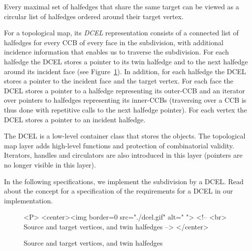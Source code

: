 Every maximal set of halfedges that share the same target can be viewed 
as a circular list of halfedges ordered %
around their target vertex.

For a topological map, its {\em DCEL} representation consists of a
connected list of halfedges for every CCB of every face in the
subdivision, with additional incidence information that enables us to
traverse the subdivision. %
For each halfedge the DCEL
stores a pointer to its twin halfedge and to the next
halfedge around its incident face (see Figure~\ref{fig:DCEL_ref}). In
addition, for each halfedge the DCEL stores a pointer to the incident
face and the target vertex.
For each face the DCEL stores a pointer to a halfedge representing
its outer-CCB and an iterator over pointers to halfedges representing
its inner-CCBs (traversing over a CCB is thus done with repetitive
calls to the next halfedge pointer).
For each vertex the DCEL stores a pointer to an incident halfedge. 

The DCEL is a low-level container class that stores the objects.
The topological map layer adds high-level functions and protection of
combinatorial validity. Iterators, handles and circulators are also
introduced in this layer (pointers are no longer visible in this layer).

In the following
specifications, we implement the subdivision by a DCEL. Read about the concept
for a specification of the requirements for a DCEL in our implementation.

\begin{figure}
\begin{ccTexOnly}
    \centerline{
       }
\end{ccTexOnly}
\caption{Source and target vertices, and twin halfedges \label{fig:DCEL_ref}}

\begin{ccHtmlOnly}
<P>
<center><img border=0 src="./dcel.gif" alt=" ">
<!-- <br> Source and target vertices, and twin halfedges -->
</center>
\end{ccHtmlOnly}
\end{figure}

